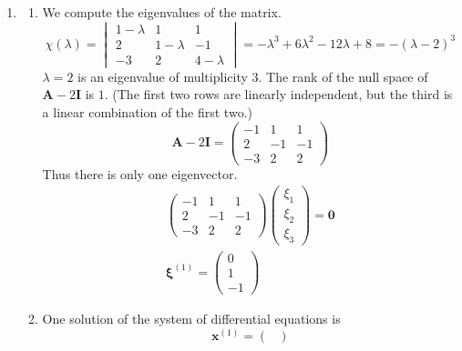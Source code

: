 {\begin{Solution}
  \label{solution 3x3 triple eigenvalue}
  \begin{enumerate}
  \item
    \begin{enumerate}
    \item
      We compute the eigenvalues of the matrix.
      \[
      \chi(\lambda) = \begin{vmatrix}
        1 - \lambda & 1 & 1\\
        2 & 1 - \lambda & -1\\
        -3 & 2 & 4 - \lambda
      \end{vmatrix}
      = - \lambda^3 + 6 \lambda^2 - 12 \lambda + 8
      = - (\lambda - 2)^3
      \]
      $\lambda = 2$ is an eigenvalue of multiplicity $3$.
      The rank of the null space of $\mathbf{A} - 2 \mathbf{I}$ is $1$. 
      (The first two rows are linearly independent, but the third is a linear 
      combination of the first two.)
      \[
      \mathbf{A} - 2 \mathbf{I} 
      = \begin{pmatrix}
        -1 & 1 & 1\\
        2 & -1 & -1\\
        -3 & 2 & 2
      \end{pmatrix}
      \]
      Thus there is only one eigenvector.  
      \begin{gather*}
        \begin{pmatrix}
          -1 & 1 & 1\\
          2 & -1 & -1\\
          -3 & 2 & 2
        \end{pmatrix}
        \begin{pmatrix}
          \xi_1 \\
          \xi_2 \\
          \xi_3
        \end{pmatrix}
        = \mathbf{0} \\
        \boldsymbol{\xi}^{(1)} = \begin{pmatrix}
          0 \\
          1 \\
          -1
        \end{pmatrix}
      \end{gather*}
    \item
      One solution of the system of differential equations is
      \[
      \mathbf{x}^{(1)} = \begin{pmatrix}

\end{pmatrix}\]
\end{enumerate}
\end{enumerate}
\end{Solution}}
